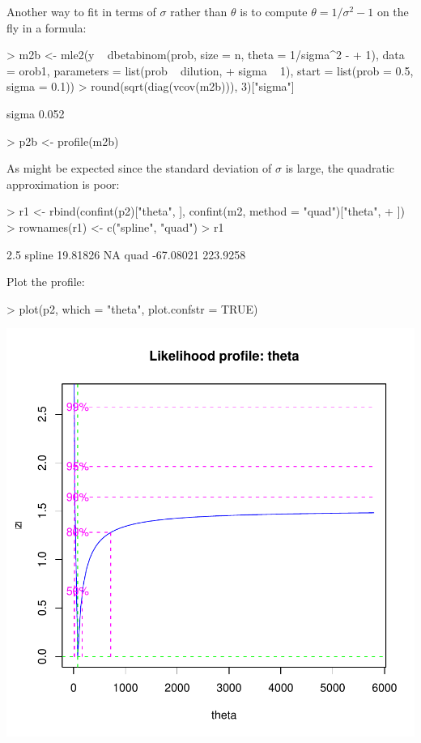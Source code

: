 \documentclass{article}
\begin{document}
Another way to fit in terms of $\sigma$ rather than $\theta$
is to compute $\theta=1/\sigma^2-1$ on the fly in a
formula:

\begin{Schunk}
\begin{Sinput}
> m2b <- mle2(y ~ dbetabinom(prob, size = n, theta = 1/sigma^2 - 
+     1), data = orob1, parameters = list(prob ~ dilution, 
+     sigma ~ 1), start = list(prob = 0.5, sigma = 0.1))
> round(sqrt(diag(vcov(m2b))), 3)["sigma"]
\end{Sinput}
\begin{Soutput}
sigma 
0.052 
\end{Soutput}
\begin{Sinput}
> p2b <- profile(m2b)
\end{Sinput}
\end{Schunk}

As might be expected since the standard deviation
of $\sigma$ is large, the quadratic approximation is
poor:

\begin{Schunk}
\begin{Sinput}
> r1 <- rbind(confint(p2)["theta", ], confint(m2, method = "quad")["theta", 
+     ])
> rownames(r1) <- c("spline", "quad")
> r1
\end{Sinput}
\begin{Soutput}
           2.5 %
spline  19.81826       NA
quad   -67.08021 223.9258
\end{Soutput}
\end{Schunk}

Plot the profile:
\begin{Schunk}
\begin{Sinput}
> plot(p2, which = "theta", plot.confstr = TRUE)
\end{Sinput}
\end{Schunk}
\includegraphics{mle2-025}
\end{document}
